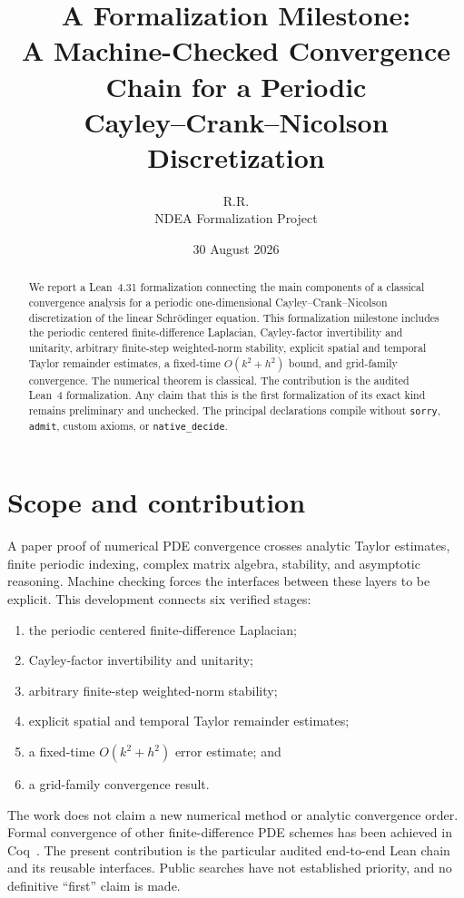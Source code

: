 \documentclass[11pt]{article}
\title{A Formalization Milestone:\\A Machine-Checked Convergence Chain for a
Periodic\\Cayley--Crank--Nicolson Discretization}
\author{R.R.\\NDEA Formalization Project}
\date{30 August 2026}
\begin{document}
\maketitle

\begin{abstract}
We report a Lean~4.31 formalization connecting the main components of a
classical convergence analysis for a periodic one-dimensional
Cayley--Crank--Nicolson discretization of the linear Schr\"odinger equation.
This formalization milestone includes the periodic centered finite-difference
Laplacian, Cayley-factor invertibility and unitarity, arbitrary finite-step
weighted-norm stability, explicit spatial and temporal Taylor remainder
estimates, a fixed-time $O(k^2+h^2)$ bound, and grid-family convergence.  The
numerical theorem is classical.  The contribution is the audited Lean~4
formalization.  Any claim that this is the first formalization of its exact
kind remains preliminary and unchecked.  The principal declarations compile
without \texttt{sorry}, \texttt{admit}, custom axioms, or
\texttt{native\_decide}.
\end{abstract}

\section{Scope and contribution}

\begin{center}
\end{center}

A paper proof of numerical PDE convergence crosses analytic Taylor estimates,
finite periodic indexing, complex matrix algebra, stability, and asymptotic
reasoning.  Machine checking forces the interfaces between these layers to be
explicit.  This development connects six verified stages:
\begin{enumerate}
  \item the periodic centered finite-difference Laplacian;
  \item Cayley-factor invertibility and unitarity;
  \item arbitrary finite-step weighted-norm stability;
  \item explicit spatial and temporal Taylor remainder estimates;
  \item a fixed-time $O(k^2+h^2)$ error estimate; and
  \item a grid-family convergence result.
\end{enumerate}
The work does not claim a new numerical method or analytic convergence order.
Formal convergence of other finite-difference PDE schemes has been achieved in
Coq~\cite{Boldo2013,Tekriwal2021}.  The present contribution is the particular
audited end-to-end Lean chain and its reusable interfaces.  Public searches
have not established priority, and no definitive ``first'' claim is made.
\end{document}
